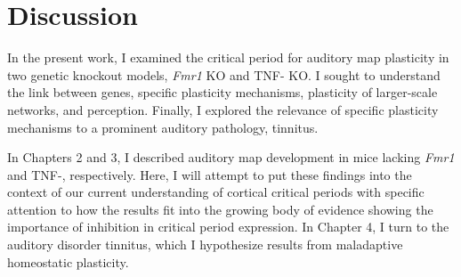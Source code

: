 \chapter{Discussion}
In the present work, I examined the critical period for auditory map plasticity in two genetic knockout models, \textit{Fmr1} KO and TNF-\textalpha{} KO. I sought to understand the link between genes, specific plasticity mechanisms, plasticity of larger-scale networks, and perception. Finally, I explored the relevance of specific plasticity mechanisms to a prominent auditory pathology, tinnitus.

In Chapters 2 and 3, I described auditory map development in mice lacking \textit{Fmr1} and TNF-\textalpha{}, respectively. Here, I will attempt to put these findings into the context of our current understanding of cortical critical periods with specific attention to how the results fit into the growing body of evidence showing the importance of inhibition in critical period expression. In Chapter 4, I turn to the auditory disorder tinnitus, which I hypothesize results from maladaptive homeostatic plasticity.


